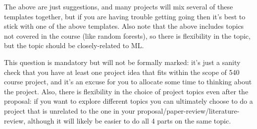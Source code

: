\documentclass{article}
\def\blu#1{{\color{blu}#1}}
\begin{document}
The above are just suggestions, and many projects will mix several of these templates together, but if you are having trouble getting going then it's best to stick with one of the above templates. Also note that the above includes topics not covered in the course (like random forests), so there is flexibility in the topic, but the topic should be closely-related to ML.

\blu{This question is mandatory but will not be formally marked: it's just a sanity check that you have at least one project idea that fits within the scope of 540 course project, and it's an excuse for you to allocate some time to thinking about the project.} Also, there is flexibility in the choice of project topics even after the proposal: if you want to explore different topics you can ultimately choose to do a project that is unrelated to the one in your proposal/paper-review/literature-review, although it will likely be easier to do all 4 parts on the same topic.
 
\end{document}

